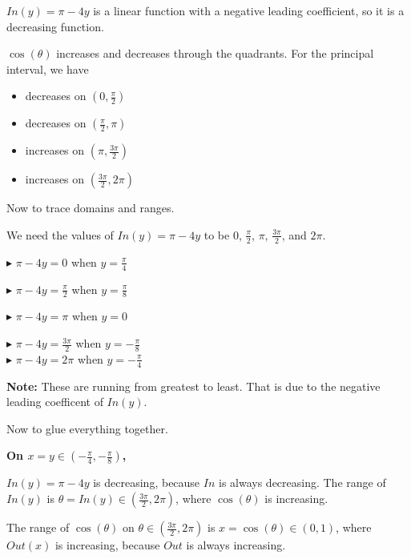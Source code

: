 \documentclass{ximera}
\begin{document}
$In(y) = \pi - 4y$ is a linear function with a negative leading coefficient, so it is a decreasing function.


$\cos(\theta)$ increases and decreases through the quadrants. For the principal interval, we have


\begin{itemize}
  \item decreases on $\left( 0, \frac{\pi}{2} \right)$
  \item decreases on $\left( \frac{\pi}{2}, \pi \right)$
  \item increases on $\left( \pi, \frac{3\pi}{2} \right)$
  \item increases on $\left( \frac{3\pi}{2}, 2\pi \right)$
\end{itemize}


Now to trace domains and ranges.


We need the values of $In(y) = \pi - 4y$ to be $0$, $\frac{\pi}{2}$, $\pi$, $\frac{3\pi}{2}$, and $2\pi$. 



$\blacktriangleright$ $\pi - 4y = 0$ when $y = \frac{\pi}{4}$ 

$\blacktriangleright$ $\pi - 4y = \frac{\pi}{2}$ when $y = \frac{\pi}{8}$ 

$\blacktriangleright$ $\pi - 4y = \pi$ when $y = 0$ 

$\blacktriangleright$ $\pi - 4y = \frac{3\pi}{2}$ when $y = -\frac{\pi}{8}$ \\

$\blacktriangleright$ $\pi - 4y = 2\pi$ when $y = -\frac{\pi}{4}$ 


\textbf{Note:}  These are running from greatest to least.  That is due to the negative leading coefficent of $In(y)$. 






Now to glue everything together. 



\textbf{\textcolor{purple!80!black}{On $x = y \in \left( -\frac{\pi}{4}, -\frac{\pi}{8} \right)$, }}



$In(y) = \pi - 4y$ is decreasing, because $In$ is always decreasing.  The range of $In(y)$ is $\theta = In(y) \in \left(\frac{3\pi}{2}, 2\pi \right)$, where $\cos(\theta)$ is increasing. 



The range of $\cos(\theta)$ on $\theta \in \left(\frac{3\pi}{2}, 2\pi \right)$ is $x = \cos(\theta) \in (0, 1)$, where $Out(x)$ is increasing, because $Out$ is always increasing. 
\end{document}
